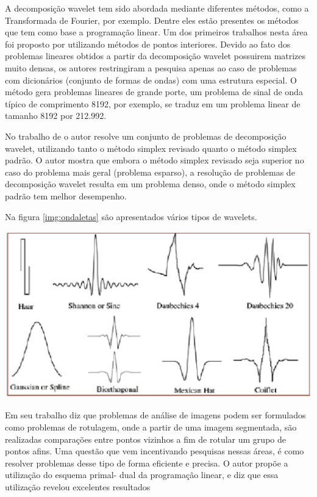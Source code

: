 A decomposição wavelet tem sido abordada mediante diferentes métodos, como a Transformada de Fourier, por exemplo. Dentre eles estão presentes os métodos que tem como base a programação linear. Um dos primeiros trabalhos nesta área foi proposto por  utilizando métodos de pontos interiores. Devido ao fato dos problemas lineares obtidos a partir da decomposição wavelet possuirem matrizes muito densas, os autores restringiram a pesquisa apenas ao caso de problemas com dicionários (conjunto de formas de ondas) com uma estrutura especial.  O método gera problemas lineares de grande porte, um problema de sinal de onda típico de comprimento 8192, por exemplo, se traduz em um problema linear de tamanho 8192 por 212.992.

No trabalho de  o autor resolve um conjunto de problemas de decomposição wavelet, utilizando tanto o método simplex revisado quanto o método simplex padrão. O autor mostra que embora o método simplex revisado seja superior no caso do problema mais geral (problema esparso), a resolução de problemas de decomposição wavelet resulta em um problema denso, onde o método simplex padrão tem melhor  desempenho.

Na figura \ref{img:ondaletas} são apresentados vários tipos de wavelets.

\begin{center}
	\includegraphics[scale=0.5]{graficos/ondaletas}
	\label{img:ondaletas}
 	\cite{FotoWave}
\end{center}

Em seu trabalho  diz que problemas de análise de imagens podem ser formulados como problemas de rotulagem, onde a partir de uma imagem segmentada, são realizadas comparações entre pontos vizinhos a fim de rotular um grupo de pontos afins. Uma questão que vem incentivando pesquisas nessas áreas, é como resolver problemas desse tipo de forma eficiente e precisa. O autor propõe a utilização do esquema primal- dual da programação linear, e diz que essa utilização revelou excelentes resultados

